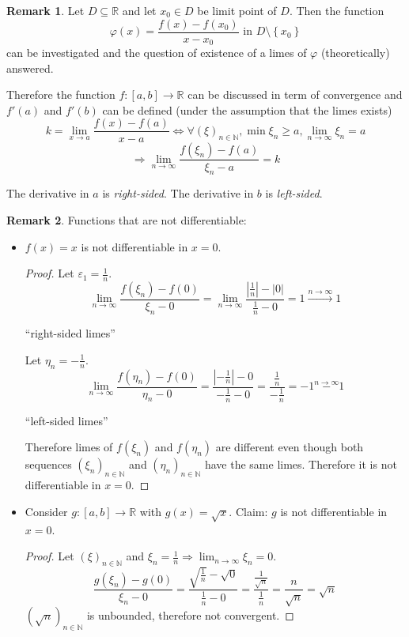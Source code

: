 \documentclass[a4paper,landscape,twocolumn]{article}
\theoremstyle{definition}
\newtheorem{rem}{Remark}
\newcommand\set[1]{\left\{#1\right\}}
\newcommand\abs[1]{\left|#1\right|}
\newcommand\seq[1]{{\left(#1\right)}_{n \in \mathbb N}}
\begin{document}
\begin{rem}
  Let $D \subseteq \mathbb R$ and let $x_0 \in D$ be limit point of $D$.
  Then the function
  \[ \varphi(x) = \frac{f(x) - f(x_0)}{x - x_0} \text{ in } D \setminus \set{x_0} \]
  can be investigated and the question of existence of a limes of $\varphi$ (theoretically) answered.

  Therefore the function $f: [a, b] \to \mathbb R$ can be discussed in term of convergence
  and $f'(a)$ and $f'(b)$ can  be defined (under the assumption that the limes exists)
  \[ k = \lim_{x \to a} \frac{f(x) - f(a)}{x - a} \Leftrightarrow \forall \seq{\xi}, \min{\xi_n} \geq a, \lim_{n\to\infty} \xi_n = a \]
  \[ \Rightarrow \lim_{n\to\infty} \frac{f(\xi_n) - f(a)}{\xi_n - a} = k \]

  The derivative in $a$ is \emph{right-sided}.
  The derivative in $b$ is \emph{left-sided}.
\end{rem}
\begin{rem}
  Functions that are not differentiable:
  \begin{itemize}
    \item $f(x) = x$ is not differentiable in $x = 0$.
      \begin{proof}
        Let $\varepsilon_1 = \frac1n$.
        \[
          \lim_{n\to\infty} \frac{f(\xi_n) - f(0)}{\xi_n - 0}
          = \lim_{n\to\infty} \frac{\abs{\frac 1n} - \abs{0}}{\frac1n - 0} = 1
          \overset{n\to\infty}{\to} 1
        \]
        \begin{center}
          \enquote{right-sided limes}
        \end{center}
        Let $\eta_n = -\frac1n$.
        \[
          \lim_{n\to\infty} \frac{f(\eta_n) - f(0)}{\eta_n - 0}
          = \frac{\abs{-\frac1n} - 0}{-\frac1n - 0}
          = \frac{\frac1n}{-\frac1n}
          = -1
          \overset{n\to\infty} -1
        \]
        \begin{center}
          \enquote{left-sided limes}
        \end{center}
        Therefore limes of $f(\xi_n)$ and $f(\eta_n)$ are different even though
        both sequences $\seq{\xi_n}$ and $\seq{\eta_n}$ have the same limes.
        Therefore it is not differentiable in $x = 0$.
      \end{proof}
    \item Consider $g: [a, b] \to \mathbb R$ with $g(x) = \sqrt{x}$.
      Claim: $g$ is not differentiable in $x = 0$.
      \begin{proof}
        Let $\seq{\xi}$ and $\xi_n = \frac1n \Rightarrow \lim_{n\to\infty} \xi_n = 0$.
        \[
          \frac{g(\xi_n) - g(0)}{\xi_n - 0}
          = \frac{\sqrt{\frac1n} - \sqrt{0}}{\frac1n - 0}
          = \frac{\frac{1}{\sqrt{n}}}{\frac1n}
          = \frac{n}{\sqrt{n}}
          = \sqrt{n}
        \]
        $\seq{\sqrt{n}}$ is unbounded, therefore not convergent.
      \end{proof}
  \end{itemize}
\end{rem}
\end{document}
